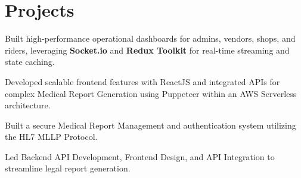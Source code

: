 \documentclass[]{deedy-resume}
\begin{document}
\begin{minipage}[t]{0.66\textwidth}
\section{Projects}
\href{https://cpanel.lyxa.ai/}{}
\begin{tightemize}
\item Built high-performance operational dashboards for admins, vendors, shops, and riders, leveraging \textbf{Socket.io} and \textbf{Redux Toolkit} for real-time streaming and state caching.
\end{tightemize}
\sectionsep

\href{https://biovica.com/}{}
\begin{tightemize}
\item Developed scalable frontend features with ReactJS and integrated APIs for complex Medical Report Generation using Puppeteer within an AWS Serverless architecture.
\end{tightemize}
\sectionsep

\href{https://www.connectivitywise.com/}{}
\begin{tightemize}
\item Built a secure Medical Report Management and authentication system utilizing the HL7 MLLP Protocol.
\end{tightemize}
\sectionsep

\begin{tightemize}
\item Led Backend API Development, Frontend Design, and API Integration to streamline legal report generation.
\end{tightemize}
\sectionsep

\end{minipage}
\end{document}
